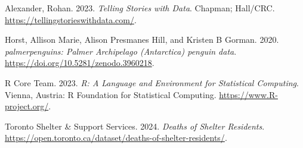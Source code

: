 \documentclass[
  letterpaper,
  DIV=11,
  numbers=noendperiod]{scrartcl}
\newlength{\cslhangindent}
\newenvironment{CSLReferences}[2] %
 {\begin{list}{}{%
  \setlength{\itemindent}{0pt}
  \setlength{\leftmargin}{0pt}
  \setlength{\parsep}{0pt}
  \ifodd #1
   \setlength{\leftmargin}{\cslhangindent}
   \setlength{\itemindent}{-1\cslhangindent}
  \fi
  \setlength{\itemsep}{#2\baselineskip}}}
 {\end{list}}
\begin{document}
\label{refs}
\begin{CSLReferences}{1}{0}
Alexander, Rohan. 2023. \emph{Telling Stories with Data}. Chapman;
Hall/CRC. \url{https://tellingstorieswithdata.com/}.

Horst, Allison Marie, Alison Presmanes Hill, and Kristen B Gorman. 2020.
\emph{{palmerpenguins: Palmer Archipelago (Antarctica) penguin data}}.
\url{https://doi.org/10.5281/zenodo.3960218}.

R Core Team. 2023. \emph{{R: A Language and Environment for Statistical
Computing}}. Vienna, Austria: R Foundation for Statistical Computing.
\url{https://www.R-project.org/}.

Toronto Shelter \& Support Services. 2024. \emph{Deaths of Shelter
Residents}.
\url{https://open.toronto.ca/dataset/deaths-of-shelter-residents/}.

\end{CSLReferences}
\end{document}
